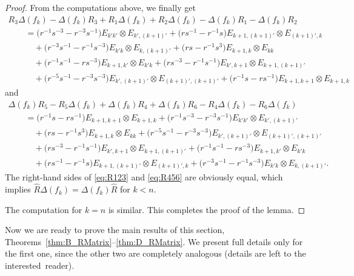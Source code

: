 \documentclass[10pt,a4paper]{amsart}
\numberwithin{equation}{section}
\begin{document}
\begin{proof}
From the computations above, we finally get
\begin{gather}
 R_{3}\Delta(f_{k}) - \Delta(f_{k})R_{3} + R_{1}\Delta(f_{k}) + R_{2}\Delta(f_{k}) - \Delta(f_{k})R_{1} - \Delta(f_{k})R_{2} \label{eq:R123}\\
 \qquad{}= \bigl(r^{-1}s^{-3} - r^{-3}s^{-1}\bigr)E_{k'k'} \otimes E_{k',(k+1)'} + \bigl(rs^{-1} - r^{-1}s\bigr)E_{k + 1,(k + 1)'} \otimes E_{(k + 1)',k} \nonumber\\
 \quad\qquad{} + \bigl(r^{-3}s^{-1} - r^{-1}s^{-3}\bigr)E_{k'k} \otimes E_{k,(k + 1)'} + \bigl(rs - r^{-1}s^{3}\bigr)E_{k + 1,k} \otimes E_{kk} \nonumber\\
 \quad\qquad{} + \bigl(r^{-1}s^{-1} - rs^{-3}\bigr)E_{k + 1,k'} \otimes E_{k'k} + \bigl(rs^{-3} - r^{-1}s^{-1}\bigr)E_{k',k + 1} \otimes E_{k + 1,(k + 1)'} \nonumber\\
 \quad\qquad{} + \bigl(r^{-5}s^{-1} - r^{-3}s^{-3}\bigr)E_{k',(k + 1)'} \otimes E_{(k + 1)',(k + 1)'} + \bigl(r^{-1}s - rs^{-1}\bigr)E_{k + 1,k + 1} \otimes E_{k + 1,k}\nonumber
\end{gather}
and
\begin{gather}
 \Delta(f_{k})R_{5} - R_{5}\Delta(f_{k}) + \Delta(f_{k})R_{4} + \Delta(f_{k})R_{6} - R_{4}\Delta(f_{k}) - R_{6}\Delta(f_{k})\label{eq:R456}\\
 \qquad{}=\bigl(r^{-1}s - rs^{-1}\bigr)E_{k + 1,k + 1} \otimes E_{k + 1,k} +\bigl(r^{-1}s^{-3} - r^{-3}s^{-1}\bigr)E_{k'k'} \otimes E_{k',(k + 1)'} \nonumber\\
 \quad\qquad{} + \bigl(rs - r^{-1}s^{3}\bigr)E_{k + 1,k} \otimes E_{kk} + \bigl(r^{-5}s^{-1} - r^{-3}s^{-3}\bigr)E_{k',(k + 1)'} \otimes E_{(k + 1)',(k + 1)'}\nonumber \\
 \quad\qquad{} + \bigl(rs^{-3} - r^{-1}s^{-1}\bigr)E_{k',k + 1} \otimes E_{k + 1,(k + 1)'} + \bigl(r^{-1}s^{-1} - rs^{-3}\bigr)E_{k + 1,k'} \otimes E_{k'k}\nonumber \\
 \quad\qquad{} + \bigl(rs^{-1} - r^{-1}s\bigr)E_{k + 1,(k + 1)'} \otimes E_{(k + 1)',k} + \bigl(r^{-3}s^{-1} - r^{-1}s^{-3}\bigr)E_{k'k} \otimes E_{k,(k + 1)'}.\nonumber
\end{gather}
The right-hand sides of \eqref{eq:R123} and \eqref{eq:R456} are obviously equal, which implies $\hat{R}\Delta(f_{k}) = \Delta(f_{k})\hat{R}$ for $k < n$.

The computation for $k = n$ is similar. This completes the proof of the lemma.
\end{proof}


Now we are ready to prove the main results of this section, Theorems~\ref{thm:B_RMatrix}--\ref{thm:D_RMatrix}. We present full details only for the first one, since the other two are completely analogous (details are left to the interested~reader).
\end{document}
